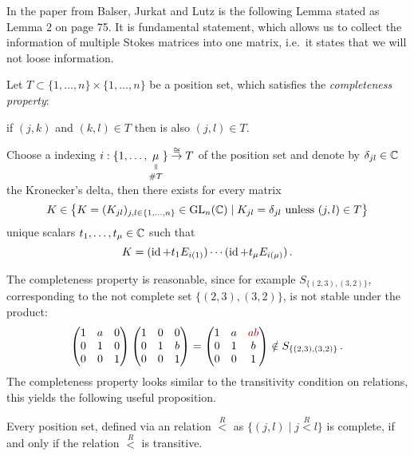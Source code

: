In the paper \cite{BJL1979Birkhoff} from Balser, Jurkat and Lutz is the
following Lemma stated as Lemma 2 on page 75.  It is fundamental statement,
which allows us to collect the information of multiple Stokes matrices into one
matrix, i.e.\ it states that we will not loose information.
\begin{lem}\label{lem:UniqueDecompositionWotBlocks}
  Let $T\subset\{1,\dots,n\}\times\{1,\dots,n\}$ be a position set, which
  satisfies the \emph{completeness property}:
  \begin{einr}
    if $(j,k)$ and $(k,l)\in T$ then is also $(j,l)\in T$.
  \end{einr}
  Choose a indexing $i:\{1,\dots,
  \underset{\#T}{\underset{\text{\rotatebox[origin=c]{-90}{$=$}}}{\mu}}\}
  \overset{\cong}{\to}T$ of the position set and denote by
  $\delta_{jl}\in\mathbb{C}$ the  Kronecker's delta,
  then there exists for every matrix
  \[
    K\in \left\{K=(K_{jl})_{j,l\in\{1,\dots,n\}}\in\operatorname{GL}_n(\mathbb{C})\mid
      K_{jl}=\delta_{jl} \text{~unless~} (j,l)\in T \right\}
  \]
  unique scalars $t_1,\dots,t_\mu\in\mathbb{C}$ such that
  \[
    K=(\operatorname{id} + t_1E_{i(1)})\cdots(\operatorname{id} + t_{\mu}E_{i(\mu)}) \,.
  \]
\end{lem}
The completeness property is reasonable, since for example
$S_{\{(2,3),(3,2)\}}$, corresponding to the not complete set
$\{(2,3),(3,2)\}$, is not stable under the product:
\begin{align*}
  \begin{pmatrix}
    1 & a & 0
  \\0 & 1 & 0
  \\0 & 0 & 1
  \end{pmatrix}
  \begin{pmatrix}
    1 & 0 & 0
  \\0 & 1 & b
  \\0 & 0 & 1
  \end{pmatrix}
  =
  \begin{pmatrix}
    1 & a & \textcolor{red!60!black}{ab}
  \\0 & 1 & b
  \\0 & 0 & 1
  \end{pmatrix}
  \notin S_{\{(2,3),(3,2)\}}
  \,.
\end{align*}
The completeness property looks similar to the transitivity condition on
relations, this yields the following useful proposition.
\begin{cor}
  Every position set, defined via an relation $\overset{R}{<}$ as
  $\{(j,l)\mid j\overset{R}{<} l\}$ is complete, if and only if the relation
  $\overset{R}{<}$ is transitive.
\end{cor}
